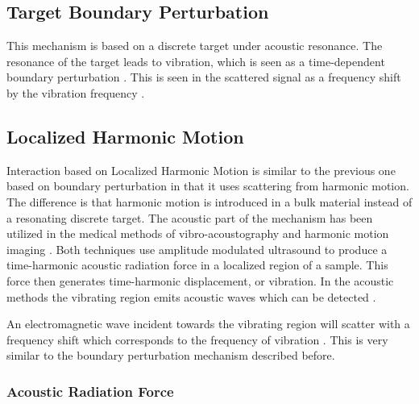 \documentclass[11pt,twoside]{eitExjobb}
\begin{document}
	\subsection{Target Boundary Perturbation}
	This mechanism is based on a discrete target under acoustic resonance. The resonance of the target leads to vibration, which is seen as a time-dependent boundary perturbation \cite{Buerkle2007}. This is seen in the scattered signal as a frequency shift by the vibration frequency \cite{Sarabandi2003}.
	
	\subsection{Localized Harmonic Motion}
	Interaction based on Localized Harmonic Motion is similar to the previous one based on boundary perturbation in that it uses scattering from harmonic motion. The difference is that harmonic motion is introduced in a bulk material instead of a resonating discrete target. The acoustic part of the mechanism has been utilized in the medical methods of vibro-acoustography and harmonic motion imaging \cite{Wang2018}. Both techniques use amplitude modulated ultrasound to produce a time-harmonic acoustic radiation force in a localized region of a sample. This force then generates time-harmonic displacement, or vibration. In the acoustic methods the vibrating region emits acoustic waves which can be detected \cite{Fatemi1998}\cite{Konofagou2003}.
	
	An electromagnetic wave incident towards the vibrating region will scatter with a frequency shift which corresponds to the frequency of vibration \cite{Top2014}. This is very similar to the boundary perturbation mechanism described before.
	
	\subsubsection{Acoustic Radiation Force}
	
\end{document}
